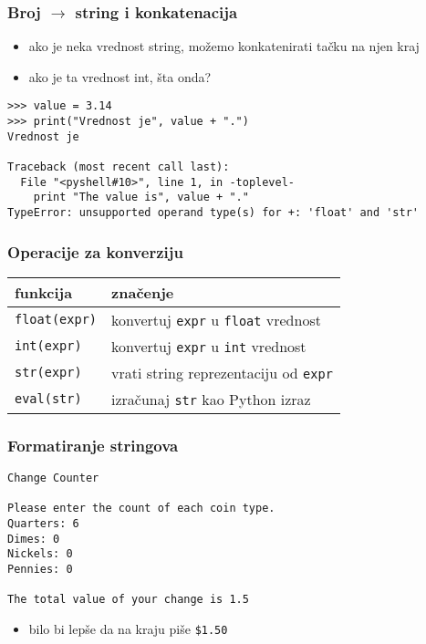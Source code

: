 \documentclass[utf8,compress]{beamer}
\begin{document}
\begin{frame}[fragile,shrink=6]
  \frametitle{Broj $\rightarrow$ string i konkatenacija}
  \begin{itemize}
    \item ako je neka vrednost string, možemo konkatenirati tačku na njen kraj
    \item ako je ta vrednost int, šta onda?
  \end{itemize}
\begin{verbatim}
>>> value = 3.14
>>> print("Vrednost je", value + ".")
Vrednost je

Traceback (most recent call last):
  File "<pyshell#10>", line 1, in -toplevel-
    print "The value is", value + "."
TypeError: unsupported operand type(s) for +: 'float' and 'str'
\end{verbatim}
\end{frame}

\begin{frame}[fragile]
  \frametitle{Operacije za konverziju}
\begin{center}
\begin{tabular}{l|l}
\textbf{funkcija} & \textbf{značenje} \\ \hline
\texttt{float(expr)} & konvertuj \texttt{expr} u \texttt{float} vrednost \\
\texttt{int(expr)} & konvertuj \texttt{expr} u \texttt{int} vrednost \\
\texttt{str(expr)} & vrati string reprezentaciju od \texttt{expr} \\
\texttt{eval(str)} & izračunaj \texttt{str} kao Python izraz
\end{tabular}
\end{center}
\end{frame}

\begin{frame}[fragile]
  \frametitle{Formatiranje stringova}
\begin{verbatim}
Change Counter

Please enter the count of each coin type.
Quarters: 6
Dimes: 0
Nickels: 0
Pennies: 0

The total value of your change is 1.5
\end{verbatim}
  \begin{itemize}
    \item bilo bi lepše da na kraju piše \texttt{\$1.50}
  \end{itemize}
\end{frame}
\end{document}
